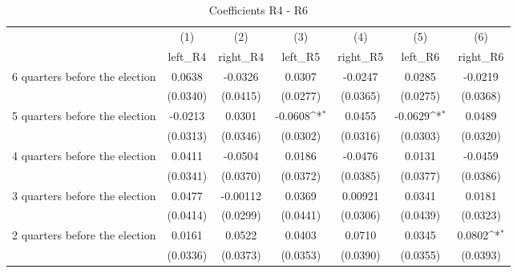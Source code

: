\begin{table}[htbp]\centering
\def\sym#1{\ifmmode^{#1}\else\(^{#1}\)\fi}
\caption{Coefficients R4 - R6}
\begin{tabular}{l*{6}{c}}
\hline\hline
                    &\multicolumn{1}{c}{(1)}&\multicolumn{1}{c}{(2)}&\multicolumn{1}{c}{(3)}&\multicolumn{1}{c}{(4)}&\multicolumn{1}{c}{(5)}&\multicolumn{1}{c}{(6)}\\
                    &\multicolumn{1}{c}{left\_R4}&\multicolumn{1}{c}{right\_R4}&\multicolumn{1}{c}{left\_R5}&\multicolumn{1}{c}{right\_R5}&\multicolumn{1}{c}{left\_R6}&\multicolumn{1}{c}{right\_R6}\\
\hline
 6 quarters before the election&      0.0638         &     -0.0326         &      0.0307         &     -0.0247         &      0.0285         &     -0.0219         \\
                    &    (0.0340)         &    (0.0415)         &    (0.0277)         &    (0.0365)         &    (0.0275)         &    (0.0368)         \\
[1em]
 5 quarters before the election&     -0.0213         &      0.0301         &     -0.0608\sym{*}  &      0.0455         &     -0.0629\sym{*}  &      0.0489         \\
                    &    (0.0313)         &    (0.0346)         &    (0.0302)         &    (0.0316)         &    (0.0303)         &    (0.0320)         \\
[1em]
 4 quarters before the election&      0.0411         &     -0.0504         &      0.0186         &     -0.0476         &      0.0131         &     -0.0459         \\
                    &    (0.0341)         &    (0.0370)         &    (0.0372)         &    (0.0385)         &    (0.0377)         &    (0.0386)         \\
[1em]
 3 quarters before the election&      0.0477         &    -0.00112         &      0.0369         &     0.00921         &      0.0341         &      0.0181         \\
                    &    (0.0414)         &    (0.0299)         &    (0.0441)         &    (0.0306)         &    (0.0439)         &    (0.0323)         \\
[1em]
 2 quarters before the election&      0.0161         &      0.0522         &      0.0403         &      0.0710         &      0.0345         &      0.0802\sym{*}  \\
                    &    (0.0336)         &    (0.0373)         &    (0.0353)         &    (0.0390)         &    (0.0355)         &    (0.0393)         \\

\end{tabular}
\end{table}

